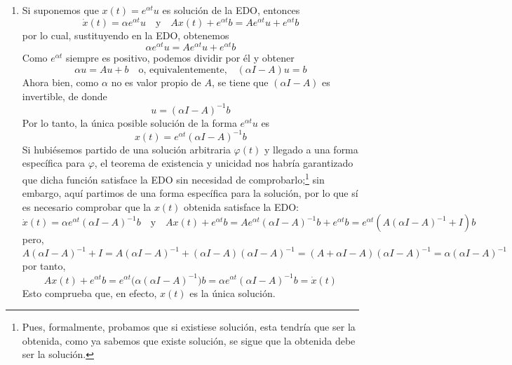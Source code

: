\begin{sol}[Demostración]
\begin{enumerate}[label = (\alph*)]
\item Si suponemos que $x(t) = e^{\alpha t}u$ es solución de la EDO, entonces
\[
\dot{x}(t) = \alpha e^{\alpha t}u%
\quad\text{y}\quad%
Ax(t) + e^{\alpha t} b = Ae^{\alpha t}u + e^{\alpha t}b
\]
por lo cual, sustituyendo en la EDO, obtenemos
\[
\alpha e^{\alpha t}u = Ae^{\alpha t}u + e^{\alpha t}b
\]
Como $e^{\alpha t}$ siempre es positivo, podemos dividir por él y obtener
\[
\alpha u = Au + b%
\quad\text{o, equivalentemente,}\quad
(\alpha I - A)u = b
\]
Ahora bien, como $\alpha$ no es valor propio de $A$, se tiene que $(\alpha I - A)$ es invertible, de donde
\[
u = (\alpha I - A)^{-1}b
\]
Por lo tanto, la única posible solución de la forma $e^{\alpha t}u$ es
\[
x(t) = e^{\alpha t}(\alpha I - A)^{-1}b
\]
Si hubiésemos partido de una solución arbitraria $\varphi(t)$ y llegado a una forma específica para $\varphi$, el teorema de existencia y unicidad nos habría garantizado que dicha función satisface la EDO sin necesidad de comprobarlo;\footnote{Pues, formalmente, probamos que si existiese solución, esta tendría que ser la obtenida, como ya sabemos que existe solución, se sigue que la obtenida debe ser la solución.} sin embargo, aquí partimos de una forma específica para la solución, por lo que sí es necesario comprobar que la $x(t)$ obtenida satisface la EDO:
\[
\dot{x}(t) = \alpha e^{\alpha t}(\alpha I - A)^{-1}b%
\quad\text{y}\quad%
Ax(t) + e^{\alpha t}b = Ae^{\alpha t}(\alpha I - A)^{-1}b + e^{\alpha t}b = e^{\alpha t}(A(\alpha I - A)^{-1} + I)b
\]
pero,
\[
A(\alpha I - A)^{-1} + I =A(\alpha I - A)^{-1} + (\alpha I - A)(\alpha I - A)^{-1} = (A + \alpha I - A)(\alpha I - A)^{-1} = \alpha(\alpha I - A)^{-1}
\]
por tanto,
\[
Ax(t) + e^{\alpha t}b = e^{\alpha t}\big(\alpha(\alpha I - A)^{-1}\big)b = \alpha e^{\alpha t}(\alpha I - A)^{-1}b = \dot{x}(t)
\]
Esto comprueba que, en efecto, $x(t)$ es la única solución.


\end{enumerate}
\end{sol}
